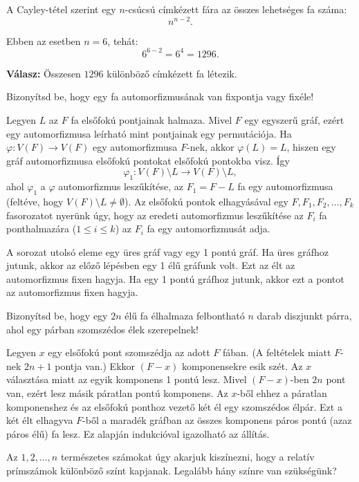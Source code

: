 \begin{solution}
\noindent A Cayley-tétel szerint egy $n$-csúcsú címkézett fára az
összes lehetséges fa száma: 
\[
n^{n-2}.
\]

Ebben az esetben $n=6$, tehát: 
\[
6^{6-2}=6^{4}=\boxed{1296}.
\]

\textbf{Válasz: } Összesen $\boxed{1296}$ különböző címkézett fa
létezik. 
\end{solution}
\begin{extraproblem}
Bizonyítsd be, hogy egy fa automorfizmusának van fixpontja vagy fixéle! 
\end{extraproblem}

\begin{solution}
Legyen $L$ az $F$ fa elsőfokú pontjainak halmaza. Mivel $F$ egy
egyszerű gráf, ezért egy automorfizmusa leírható mint pontjainak egy
permutációja. Ha $\varphi:V(F)\to V(F)$ egy automorfizmusa $F$-nek,
akkor $\varphi(L)=L$, hiszen egy gráf automorfizmusa elsőfokú pontokat
elsőfokú pontokba visz. Így 
\[
\varphi_{1}:V(F)\setminus L\to V(F)\setminus L,
\]
ahol $\varphi_{1}$ a $\varphi$ automorfizmus leszűkítése, az $F_{1}=F-L$
fa egy automorfizmusa (feltéve, hogy $V(F)\setminus L\neq\emptyset$).
Az elsőfokú pontok elhagyásával egy $F,F_{1},F_{2},\ldots,F_{k}$
fasorozatot nyerünk úgy, hogy az eredeti automorfizmus leszűkítése
az $F_{i}$ fa ponthalmazára ($1\leq i\leq k$) az $F_{i}$ fa egy
automorfizmusát adja.

A sorozat utolsó eleme egy üres gráf vagy egy 1 pontú gráf. Ha üres
gráfhoz jutunk, akkor az előző lépésben egy 1 élű gráfunk volt. Ezt
az élt az automorfizmus fixen hagyja. Ha egy 1 pontú gráfhoz jutunk,
akkor ezt a pontot az automorfizmus fixen hagyja. 
\end{solution}
\begin{extraproblem}
Bizonyítsd be, hogy egy $2n$ élű fa élhalmaza felbontható $n$ darab
diszjunkt párra, ahol egy párban szomszédos élek szerepelnek! 
\end{extraproblem}

\begin{solution}
Legyen $x$ egy elsőfokú pont szomszédja az adott $F$ fában. (A feltételek
miatt $F$-nek $2n+1$ pontja van.) Ekkor $(F-x)$ komponensekre esik
szét. Az $x$ választása miatt az egyik komponens 1 pontú lesz. Mivel
$(F-x)$-ben $2n$ pont van, ezért lesz másik páratlan pontú komponens.
Az $x$-ből ehhez a páratlan komponenshez és az elsőfokú ponthoz vezető
két él egy szomszédos élpár. Ezt a két élt elhagyva $F$-ből a maradék
gráfban az összes komponens páros pontú (azaz páros élű) fa lesz.
Ez alapján indukcióval igazolható az állítás. 
\end{solution}
\begin{extraproblem}
Az $1,2,\ldots,n$ természetes számokat úgy akarjuk kiszínezni, hogy
a relatív prímszámok különböző színt kapjanak. Legalább hány színre
van szükségünk? 
\end{extraproblem}

